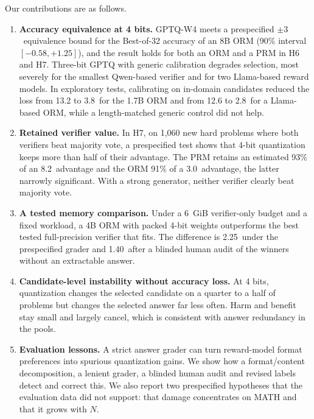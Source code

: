 Our contributions are as follows.
\begin{enumerate}
\item \textbf{Accuracy equivalence at 4 bits.} GPTQ-W4 meets a prespecified $\pm3$\pp\
equivalence bound for the Best-of-32 accuracy of an 8B ORM (90\% interval $[-0.58,
+1.25]$), and the result holds for both an ORM and a PRM in H6 and H7.
Three-bit GPTQ with generic calibration degrades selection, most severely for the
smallest Qwen-based verifier and for two Llama-based reward models. In exploratory
tests, calibrating on in-domain candidates reduced the loss from 13.2 to 3.8\pp\ for the
1.7B ORM and from 12.6 to 2.8\pp\ for a Llama-based ORM, while a length-matched generic
control did not help.
\item \textbf{Retained verifier value.} In H7, on 1,060 new hard problems where both verifiers beat majority vote, a prespecified test shows that 4-bit
quantization keeps more than half of their advantage. The PRM retains an estimated 93\%
of an 8.2\pp\ advantage and the ORM 91\% of a 3.0\pp\ advantage, the latter narrowly
significant. With a strong generator, neither verifier clearly beat majority vote.
\item \textbf{A tested memory comparison.} Under a 6~GiB verifier-only budget and a fixed
workload, a 4B ORM with packed 4-bit weights outperforms the best tested full-precision
verifier that fits. The difference is 2.25\pp\ under the prespecified grader and
1.40\pp\ after a blinded human audit of the winners without an extractable answer.
\item \textbf{Candidate-level instability without accuracy loss.} At 4 bits,
quantization changes the selected candidate on a quarter to a half of problems but
changes the selected answer far less often. Harm and benefit stay small and largely
cancel, which is consistent with answer redundancy in the pools.
\item \textbf{Evaluation lessons.} A strict answer grader can turn reward-model format
preferences into spurious quantization gains. We show how a format/content
decomposition, a lenient grader, a blinded human audit and revised labels detect and correct this.
We also report two prespecified hypotheses that the evaluation data did not support:
that damage concentrates on MATH and that it grows with $N$.
\end{enumerate}
